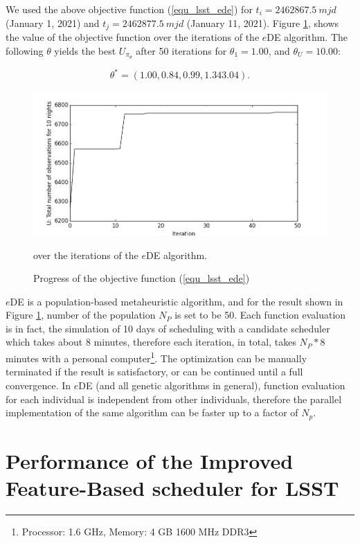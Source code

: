 \documentclass[12pt,aas_macros]{article}
\theoremstyle{definition}
\begin{document}
We used the above objective function (\ref{equ_lsst_ede}) for $t_i = 2462867.5~mjd$ (January 1, 2021) and $t_j = 2462877.5~mjd$ (January 11, 2021). Figure \ref{fig_eDEObjectiveFunction}, shows the value of the objective function over the iterations of the $e$DE algorithm. The following $\theta$ yields the best $U_{\pi_{\theta}}$ after 50 iterations for $\theta_1 = 1.00$, and $\theta_U = 10.00$:

\begin{equation}
\theta^* = (1.00, 0.84, 0.99,  1.34  3.04).
\end{equation}



\begin{figure}[h!]
\begin{center}
\includegraphics[width=0.5\linewidth]{eDEObjectiveFunction.png}
\caption{Progress of the objective function (\ref{equ_lsst_ede})} over the iterations of the $e$DE algorithm.
\label{fig_eDEObjectiveFunction}
\end{center}
\end{figure}

$e$DE is a population-based metaheuristic algorithm, and for the result shown in Figure \ref{fig_eDEObjectiveFunction}, number of the population $N_P$ is set to be 50. Each function evaluation is in fact, the simulation of 10 days of scheduling with a candidate scheduler which takes about 8 minutes, therefore each iteration, in total, takes $N_P * 8$ minutes with a personal computer\footnote{Processor: 1.6 GHz, Memory: 4 GB 1600 MHz DDR3}. The optimization can be manually terminated if the result is satisfactory, or can be continued until a full convergence. In $e$DE (and all genetic algorithms in general), function evaluation for each individual is independent from other individuals, therefore the parallel implementation of the same algorithm can be faster up to a factor of $N_p$. 

 


\section{Performance of the Improved Feature-Based scheduler for LSST}\label{sec_comp}
\end{document}
